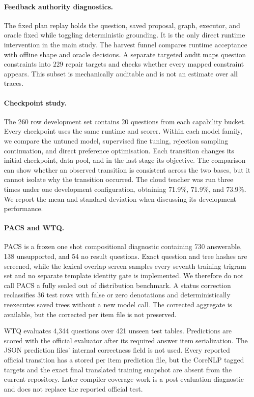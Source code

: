 \documentclass{article}
\begin{document}
\paragraph{Feedback authority diagnostics.}
The fixed plan replay holds the question, saved proposal, graph, executor, and oracle fixed while
toggling deterministic grounding.  It is the only direct runtime intervention in the main study.
The harvest funnel compares runtime acceptance with offline shape and oracle decisions.  A separate
targeted audit maps question constraints into 229 repair targets and checks whether every mapped
constraint appears.  This subset is mechanically auditable and is not an estimate over all traces.

\paragraph{Checkpoint study.}
The 260 row development set contains 20 questions from each capability bucket.  Every checkpoint
uses the same runtime and scorer.  Within each model family, we compare the untuned model, supervised
fine tuning, rejection sampling continuation, and direct preference optimisation.  Each transition
changes its initial checkpoint, data pool, and in the last stage its objective.  The comparison can
show whether an observed transition is consistent across the two bases, but it cannot isolate why
the transition occurred.  The cloud teacher was run three times under one development
configuration, obtaining 71.9\%, 71.9\%, and 73.9\%.  We report the mean and standard deviation when
discussing its development performance.

\paragraph{PACS and WTQ.}
PACS is a frozen one shot compositional diagnostic containing 730 answerable, 138 unsupported, and
54 no result questions.  Exact question and tree hashes are screened, while the lexical overlap
screen samples every seventh training trigram set and no separate template identity gate is
implemented.  We therefore do not call PACS a fully sealed out of distribution benchmark.  A
status correction reclassifies 36 test rows with false or zero denotations and deterministically
reexecutes saved trees without a new model call.  The corrected aggregate is available, but the
corrected per item file is not preserved.

WTQ evaluates 4,344 questions over 421 unseen test tables.  Predictions are scored with the official
evaluator after its required answer item serialization.  The JSON prediction files' internal
correctness field is not used.  Every reported official transition has a stored per item prediction
file, but the CoreNLP tagged targets and the exact final translated training snapshot are absent
from the current repository.  Later compiler coverage work is a post evaluation diagnostic and
does not replace the reported official test.
\end{document}

